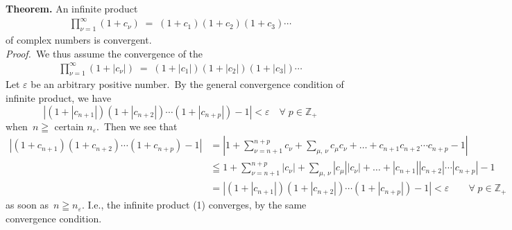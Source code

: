 \documentclass[12pt]{article}
\theoremstyle{definition}
\begin{document}
\textbf{Theorem.}\; An  infinite product
\begin{align}
\prod_{\nu=1}^\infty(1\!+\!c_\nu) \;=\; (1\!+\!c_1)(1\!+\!c_2)(1\!+\!c_3)\cdots
\end{align}
of complex numbers is convergent.\\

{\em Proof.}\, We thus assume the convergence of the 
\begin{align}
\prod_{\nu=1}^\infty(1\!+\!|c_\nu|) \;=\; (1\!+\!|c_1|)(1\!+\!|c_2|)(1\!+\!|c_3|)\cdots
\end{align}
Let $\varepsilon$ be an arbitrary positive number.\, By the general convergence condition of infinite product, we have
$$|(1\!+\!|c_{n+1}|)(1\!+\!|c_{n+2}|)\cdots(1\!+\!|c_{n+p}|)-1| < \varepsilon 
\quad \forall\; p \in \mathbb{Z}_+$$
when\, $n \geqq$ certain $n_\varepsilon$.\, Then we see that
\begin{align*}
|(1\!+\!c_{n+1})(1\!+\!c_{n+2})\cdots(1\!+\!c_{n+p})-1| 
& =    |1+\sum_{\nu=n+1}^{n+p}c_\nu+\sum_{\mu,\,\nu}c_\mu c_\nu+\ldots+c_{n+1}c_{n+2}\cdots c_{n+p}-1|\\
& \leqq 1+\sum_{\nu=n+1}^{n+p}|c_\nu|+\sum_{\mu,\,\nu}|c_\mu||c_\nu|+\ldots+|c_{n+1}||c_{n+2}|\cdots|c_{n+p}|-1\\
& = |(1\!+\!|c_{n+1}|)(1\!+\!|c_{n+2}|)\cdots(1\!+\!|c_{n+p}|)-1| < \varepsilon 
\qquad \forall\; p \in \mathbb{Z}_+
\end{align*}
as soon as\, $n \geqq n_\varepsilon$.\; I.e., the infinite product (1) converges, by the same convergence condition.

\end{document}
